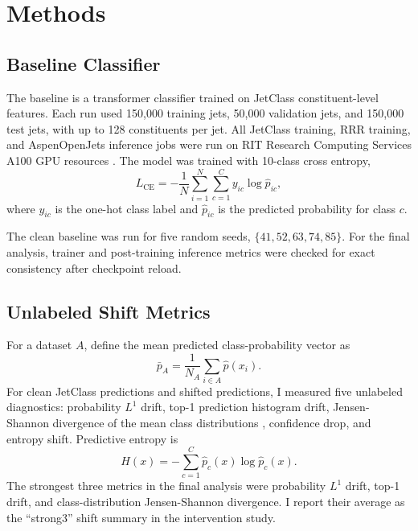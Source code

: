 \documentclass[11pt]{article}
\begin{document}
\section{Methods}

\subsection{Baseline Classifier}

The baseline is a transformer classifier trained on JetClass constituent-level features. Each run used 150,000 training jets, 50,000 validation jets, and 150,000 test jets, with up to 128 constituents per jet. All JetClass training, RRR training, and AspenOpenJets inference jobs were run on RIT Research Computing Services A100 GPU resources \cite{ritrc2026}. The model was trained with 10-class cross entropy,
\begin{equation}
L_{\mathrm{CE}} = -\frac{1}{N}\sum_{i=1}^{N}\sum_{c=1}^{C} y_{ic}\log \hat{p}_{ic},
\end{equation}
where $y_{ic}$ is the one-hot class label and $\hat{p}_{ic}$ is the predicted probability for class $c$.

The clean baseline was run for five random seeds, $\{41,52,63,74,85\}$. For the final analysis, trainer and post-training inference metrics were checked for exact consistency after checkpoint reload.

\subsection{Unlabeled Shift Metrics}

For a dataset $A$, define the mean predicted class-probability vector as
\begin{equation}
\bar{p}_{A} = \frac{1}{N_A}\sum_{i\in A}\hat{p}(x_i).
\end{equation}
For clean JetClass predictions and shifted predictions, I measured five unlabeled diagnostics: probability $L^1$ drift, top-1 prediction histogram drift, Jensen-Shannon divergence of the mean class distributions \cite{lin1991divergence}, confidence drop, and entropy shift. Predictive entropy is
\begin{equation}
H(x) = -\sum_{c=1}^{C}\hat{p}_c(x)\log \hat{p}_c(x).
\end{equation}
The strongest three metrics in the final analysis were probability $L^1$ drift, top-1 drift, and class-distribution Jensen-Shannon divergence. I report their average as the ``strong3'' shift summary in the intervention study.
\end{document}
